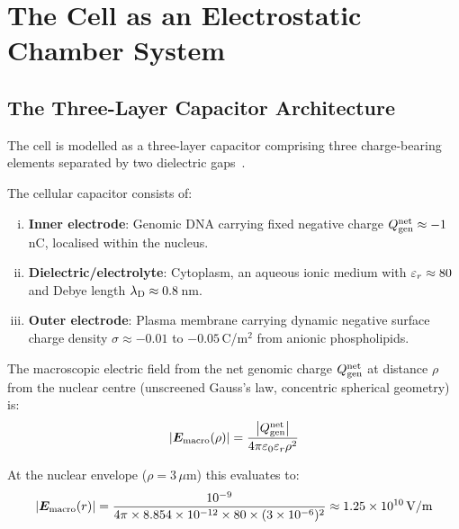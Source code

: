 \section{The Cell as an Electrostatic Chamber System}
\label{v:sec:chambers}

\subsection{The Three-Layer Capacitor Architecture}

The cell is modelled as a three-layer capacitor comprising three charge-bearing elements separated by two dielectric gaps~\cite{McLaughlin1989,Bhaskara2010}.

\begin{definition}
The cellular capacitor consists of:
\begin{enumerate}[(i)]
  \item \textbf{Inner electrode}: Genomic DNA carrying fixed negative charge $Q_{\mathrm{gen}}^{\mathrm{net}} \approx -1$\,nC, localised within the nucleus.
  \item \textbf{Dielectric/electrolyte}: Cytoplasm, an aqueous ionic medium with $\varepsilon_r \approx 80$ and Debye length $\lambda_{\mathrm{D}} \approx 0.8$\,nm.
  \item \textbf{Outer electrode}: Plasma membrane carrying dynamic negative surface charge density $\sigma \approx -0.01$ to $-0.05$\,C/m$^2$ from anionic phospholipids.
\end{enumerate}
\end{definition}

The macroscopic electric field from the net genomic charge $Q_{\mathrm{gen}}^{\mathrm{net}}$ at distance $\rho$ from the nuclear centre (unscreened Gauss's law, concentric spherical geometry) is:
\begin{equation}
  \abs{\boldsymbol{E}_{\mathrm{macro}}(\rho)} = \frac{\abs{Q_{\mathrm{gen}}^{\mathrm{net}}}}{4\pi \varepsilon_{0} \varepsilon_r \rho^2}
  \label{v:eq:cytoplasmic_field}
\end{equation}

At the nuclear envelope ($\rho = 3\,\mu$m) this evaluates to:
\begin{equation}
  \abs{\boldsymbol{E}_{\mathrm{macro}}(r)} = \frac{10^{-9}}{4\pi \times 8.854 \times 10^{-12} \times 80 \times (3 \times 10^{-6})^2} \approx 1.25 \times 10^{10}\,\mathrm{V/m}
\end{equation}

